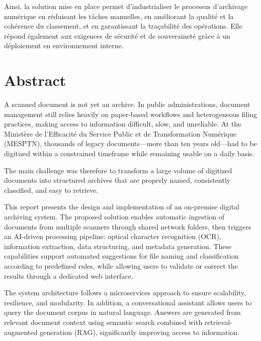 \documentclass[12pt,a4paper]{report}
\newcommand{\nomMinistere}{Ministère de l'Efficacité du Service Public et de Transformation Numérique (MESPTN)}
\begin{document}
Ainsi, la solution mise en place permet d’industrialiser le processus d’archivage numérique en réduisant les tâches manuelles, en améliorant la qualité et la cohérence du classement, et en garantissant la traçabilité des opérations. Elle répond également aux exigences de sécurité et de souveraineté grâce à un déploiement en environnement interne.

\chapter*{Abstract}
A scanned document is not yet an archive. In public administrations, document management still relies heavily on paper-based workflows and heterogeneous filing practices, making access to information difficult, slow, and unreliable. At the \nomMinistere{}, thousands of legacy documents—more than ten years old—had to be digitized within a constrained timeframe while remaining usable on a daily basis.

The main challenge was therefore to transform a large volume of digitized documents into structured archives that are properly named, consistently classified, and easy to retrieve.

This report presents the design and implementation of an on-premise digital archiving system. The proposed solution enables automatic ingestion of documents from multiple scanners through shared network folders, then triggers an AI-driven processing pipeline: optical character recognition (OCR), information extraction, data structuring, and metadata generation. These capabilities support automated suggestions for file naming and classification according to predefined rules, while allowing users to validate or correct the results through a dedicated web interface.

The system architecture follows a microservices approach to ensure scalability, resilience, and modularity. In addition, a conversational assistant allows users to query the document corpus in natural language. Answers are generated from relevant document context using semantic search combined with retrieval-augmented generation (RAG), significantly improving access to information.
\end{document}
